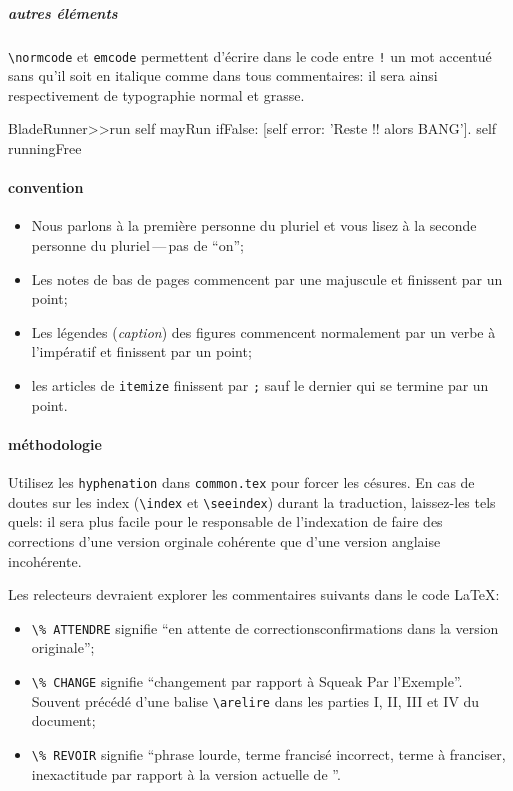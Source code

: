 \documentclass[a4paper,10pt,twoside]{book}
\begin{document}
\subparagraph{autres éléments}

\verb|\normcode| et \verb|emcode| permettent d'écrire dans le code
entre \texttt{!} un
mot accentué sans qu'il soit en italique comme dans tous commentaires:
il sera ainsi respectivement de typographie normal et grasse.

\begin{code}{}
BladeRunner>>run
  self mayRun ifFalse: [self error: 'Reste !! alors BANG'].
  self runningFree
\end{code}

\paragraph{convention}

\begin{itemize}
\item Nous parlons à la première personne du pluriel et vous lisez à
  la seconde personne du pluriel\,---\,pas de ``on'';
\item Les notes de bas de pages commencent par une majuscule et
  finissent par un point;
\item Les légendes (\emph{caption}) des figures commencent normalement
  par un verbe à l'impératif et finissent par un point;
\item les articles de \verb|itemize| finissent par \verb|;| sauf le
  dernier qui se termine par un point.
\end{itemize}

\paragraph{méthodologie}

Utilisez les \verb|hyphenation| dans \texttt{common.tex} pour forcer
les césures. En cas de doutes sur les index (\verb|\index| et
\verb|\seeindex|) durant la traduction, laissez-les tels quels: il
sera plus facile pour le responsable de l'indexation de faire des
corrections d'une version orginale cohérente que d'une version
anglaise incohérente.

Les relecteurs devraient explorer les commentaires suivants dans le
code \LaTeX:
\begin{itemize}
\item \verb|\% ATTENDRE|  signifie ``en attente de
  corrections\/confirmations dans la version originale'';
\item \verb|\% CHANGE|  signifie ``changement par rapport à Squeak Par
  l'Exemple''. Souvent précédé d'une balise \verb|\arelire| dans les
  parties I, II, III et IV du document;
\item \verb|\% REVOIR|  signifie ``phrase lourde, terme francisé
  incorrect, terme à franciser, inexactitude par rapport à la version
  actuelle de \pharo''.
\end{itemize}
\end{document}
